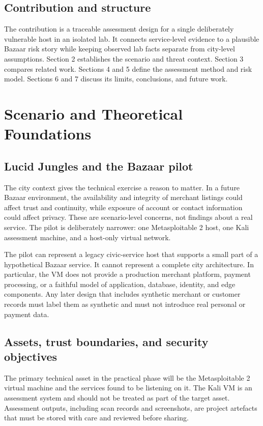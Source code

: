 \documentclass[11pt,a4paper]{article}
\begin{document}
\subsection{Contribution and structure}
The contribution is a traceable assessment design for a single deliberately vulnerable host in an isolated lab. It connects service-level evidence to a plausible Bazaar risk story while keeping observed lab facts separate from city-level assumptions. Section 2 establishes the scenario and threat context. Section 3 compares related work. Sections 4 and 5 define the assessment method and risk model. Sections 6 and 7 discuss its limits, conclusions, and future work.

\section{Scenario and Theoretical Foundations}
\subsection{Lucid Jungles and the Bazaar pilot}
The city context gives the technical exercise a reason to matter. In a future Bazaar environment, the availability and integrity of merchant listings could affect trust and continuity, while exposure of account or contact information could affect privacy. These are scenario-level concerns, not findings about a real service. The pilot is deliberately narrower: one Metasploitable 2 host, one Kali assessment machine, and a host-only virtual network.

The pilot can represent a legacy civic-service host that supports a small part of a hypothetical Bazaar service. It cannot represent a complete city architecture. In particular, the VM does not provide a production merchant platform, payment processing, or a faithful model of application, database, identity, and edge components. Any later design that includes synthetic merchant or customer records must label them as synthetic and must not introduce real personal or payment data.

\subsection{Assets, trust boundaries, and security objectives}
The primary technical asset in the practical phase will be the Metasploitable 2 virtual machine and the services found to be listening on it. The Kali VM is an assessment system and should not be treated as part of the target asset. Assessment outputs, including scan records and screenshots, are project artefacts that must be stored with care and reviewed before sharing.
\end{document}
